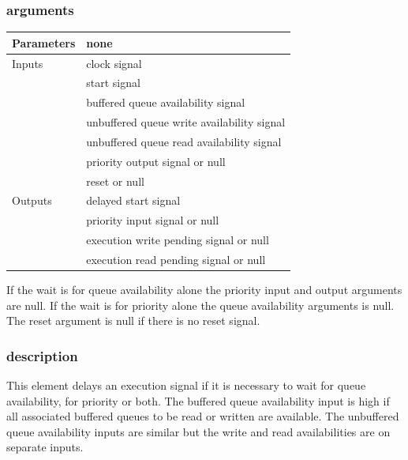 \documentclass[10pt,a4paper,twoside,fleqn]{book}
\begin{document}
                \subsubsection{arguments}

                    \begin{tabular}{| l | l |}
                    \hline
                    Parameters  & none \\
                    \hline
                    Inputs      & clock signal \\
                                & start signal \\
                                & buffered queue availability signal \\
                                & unbuffered queue write availability signal \\
                                & unbuffered queue read availability signal \\
                                & priority output signal or null \\
                                & reset or null \\
                    \hline
                    Outputs     & delayed start signal \\
                                & priority input signal or null \\
                                & execution write pending signal or null \\
                                & execution read pending signal or null \\
                    \hline
                    \end{tabular}
                    
                    If the wait is for queue availability alone the
                    priority input and output arguments are null. If the
                    wait is for priority alone the queue availability arguments
                    is null. The reset argument is null if there is no
                    reset signal.

                \subsubsection{description}

                    This element delays an execution signal if it is necessary to
                    wait for queue availability, for priority or both. The buffered
                    queue availability input is high if all associated buffered
                    queues to be read or written are available. The unbuffered queue
                    availability inputs are similar but the write and read
                    availabilities are on separate inputs.
\end{document}
